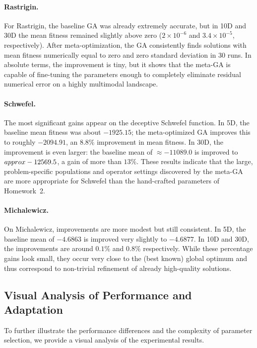\documentclass[11pt]{article}
\begin{document}
\paragraph{Rastrigin.}
For Rastrigin, the baseline GA was already extremely accurate, but in 10D
and 30D the mean fitness remained slightly above zero
($2\times10^{-6}$ and $3.4\times10^{-5}$, respectively).
After meta-optimization, the GA consistently finds solutions with mean fitness
numerically equal to zero and zero standard deviation in 30 runs.
In absolute terms, the improvement is tiny, but it shows that the
meta-GA is capable of fine-tuning the parameters enough to completely
eliminate residual numerical error on a highly multimodal landscape.

\paragraph{Schwefel.}
The most significant gains appear on the deceptive Schwefel function.
In 5D, the baseline mean fitness was about $-1925.15$; the meta-optimized GA
improves this to roughly $-2094.91$, an $8.8\%$ improvement in mean fitness.
In 30D, the improvement is even larger:
the baseline mean of $\approx -11089.0$ is improved to
$\\approx -12569.5$, a gain of more than $13\%$.
These results indicate that the large, problem-specific populations and
operator settings discovered by the meta-GA are more appropriate for Schwefel
than the hand-crafted parameters of Homework~2.

\paragraph{Michalewicz.}
On Michalewicz, improvements are more modest but still consistent.
In 5D, the baseline mean of $-4.6863$ is improved very slightly to $-4.6877$.
In 10D and 30D, the improvements are around $0.1\%$ and $0.8\%$ respectively.
While these percentage gains look small, they occur very close to the
(best known) global optimum and thus correspond to non-trivial refinement
of already high-quality solutions.

\subsection{Visual Analysis of Performance and Adaptation}

To further illustrate the performance differences and the complexity of parameter selection, we provide a visual analysis of the experimental results.
\end{document}
